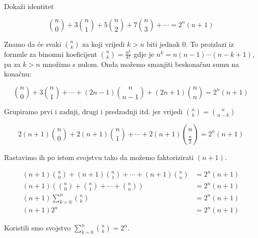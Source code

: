 \documentclass[exam.tex]{subfiles}
\begin{document}
	Dokaži identitet
	
	\[ \binom{n}{0} + 3 \binom{n}{1} + 5 \binom{n}{2} + 7 \binom{n}{3} + \cdots = 2^n (n + 1) \]
	
	Znamo da će svaki \( \displaystyle \binom{n}{k} \) za koji vrijedi \( k > n \) biti jednak 0. To proizlazi iz formule za binomni koeficijent \( \displaystyle \binom{n}{k} = \frac{n^{\underline{k}}}{k!} \) gdje je \( n^{\underline{k}} = n (n - 1) \cdots (n - k + 1) \), pa za \( k > n\) množimo s nulom. Onda možemo smanjiti beskonačnu sumu na konačnu:
	
	\[ \binom{n}{0} + 3 \binom{n}{1} + \cdots + (2n - 1) \binom{n}{n - 1} + (2n + 1) \binom{n}{n} = 2^n (n + 1) \]
	
	Grupiramo prvi i zadnji, drugi i predzadnji itd. jer vrijedi \( \binom{n}{k} = \binom{n}{n - k} \)
	
	\[ 2(n + 1) \binom{n}{0} + 2(n + 1) \binom{n}{1} + \cdots + 2(n + 1) \binom{n}{\frac{n}{2}} = 2^n (n + 1) \]
	
	Rastavimo ih po istom svojstvu tako da možemo faktorizirati \( (n + 1) \).
	
	\begin{align*}
		(n + 1) \binom{n}{0} + (n + 1) \binom{n}{1} + \cdots + (n + 1) \binom{n}{n} &= 2^n (n + 1) \\
		(n + 1) \left (\binom{n}{0} + \binom{n}{1} + \cdots + \binom{n}{n} \right) &= 2^n (n + 1) \\
		(n + 1) \sum\limits^n_{k=0} \binom{n}{k} &= 2^n (n + 1) \\
		(n + 1) 2^n &= 2^n (n + 1)
	\end{align*}
	
	Koristili smo svojstvo \( \sum\limits^n_{k=0} \binom{n}{k} = 2^n \).
\end{document}
